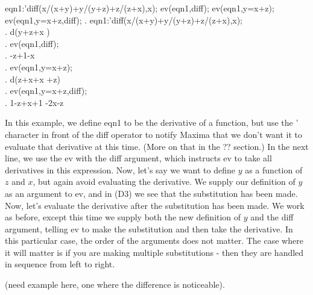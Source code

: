 \vspace{3ex}

\beginmaximasession
eqn1:'diff(x/(x+y)+y/(y+z)+z/(z+x),x);
ev(eqn1,diff);
ev(eqn1,y=x+z);
ev(eqn1,y=x+z,diff);
\maximatexsession
{}.  eqn1:'diff(x/(x+y)+y/(y+z)+z/(z+x),x); \\
.   {{d}}\*\left({{y}}+{{z}}+{{x
 }}\right) \\
.  ev(eqn1,diff); \\
.   -{{z}}+{{1}}-{{x}} \\
.  ev(eqn1,y=x+z); \\
.   {{d}}\*\left({{z+x}}+{{x}}
 +{{z}}\right) \\
.  ev(eqn1,y=x+z,diff); \\
.   {{1}}-{{z+x}}+{{1
 }}-{{2\*x}}-{{z}} \\
\endmaximasession

\vspace{3ex}

In this example, we define eqn1 to be the derivative of a function,
but use the ' character in front of the diff operator to notify Maxima
that we don't want it to evaluate that derivative at this time. (More
on that in the ?? section.) In the next line, we use the ev with the
diff argument, which instructs ev to take all derivatives in this
expression. Now, let's say we want to define \( y \) as a function
of \( z \) and \( x \), but again avoid evaluating the derivative.
We supply our definition of \( y \) as an argument to ev, and in
(D3) we see that the substitution has been made. Now, let's evaluate
the derivative after the substitution has been made. We work as before,
except this time we supply both the new definition of \( y \) and
the diff argument, telling ev to make the substitution and then take
the derivative. In this particular case, the order of the arguments
does not matter. The case where it will matter is if you are making
multiple substitutions - then they are handled in sequence from left
to right. 

\vspace{3ex}

(need example here, one where the difference is noticeable).

\vspace{3ex}

